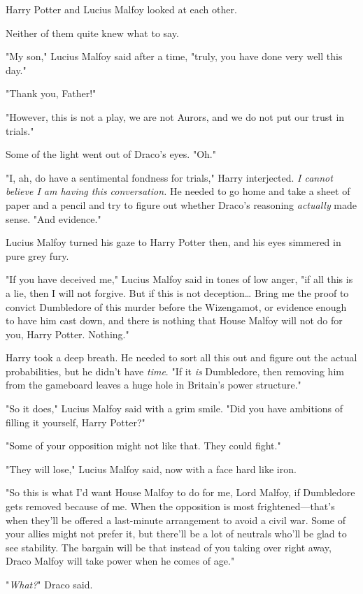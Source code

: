 Harry Potter and Lucius Malfoy looked at each other.

Neither of them quite knew what to say.

"My son," Lucius Malfoy said after a time, "truly, you have done very well this
day."

"Thank you, Father!"

"However, this is not a play, we are not Aurors, and we do not put our trust in
trials."

Some of the light went out of Draco's eyes. "Oh."

"I, ah, do have a sentimental fondness for trials," Harry interjected. \emph{I
cannot believe I am having this conversation.} He needed to go home and take a
sheet of paper and a pencil and try to figure out whether Draco's reasoning
\emph{actually} made sense. "And evidence."

Lucius Malfoy turned his gaze to Harry Potter then, and his eyes simmered in
pure grey fury.

"If you have deceived me," Lucius Malfoy said in tones of low anger, "if all
this is a lie, then I will not forgive. But if this is not deception{\ldots}
Bring me the proof to convict Dumbledore of this murder before the Wizengamot,
or evidence enough to have him cast down, and there is nothing that House
Malfoy will not do for you, Harry Potter. Nothing."

Harry took a deep breath. He needed to sort all this out and figure out the
actual probabilities, but he didn't have \emph{time}. "If it \emph{is}
Dumbledore, then removing him from the gameboard leaves a huge hole in
Britain's power structure."

"So it does," Lucius Malfoy said with a grim smile. "Did you have ambitions of
filling it yourself, Harry Potter?"

"Some of your opposition might not like that. They could fight."

"They will lose," Lucius Malfoy said, now with a face hard like iron.

"So this is what I'd want House Malfoy to do for me, Lord Malfoy, if Dumbledore
gets removed because of me. When the opposition is most frightened---that's
when they'll be offered a last-minute arrangement to avoid a civil war. Some of
your allies might not prefer it, but there'll be a lot of neutrals who'll be
glad to see stability. The bargain will be that instead of you taking over
right away, Draco Malfoy will take power when he comes of age."

"\emph{What?}" Draco said.

